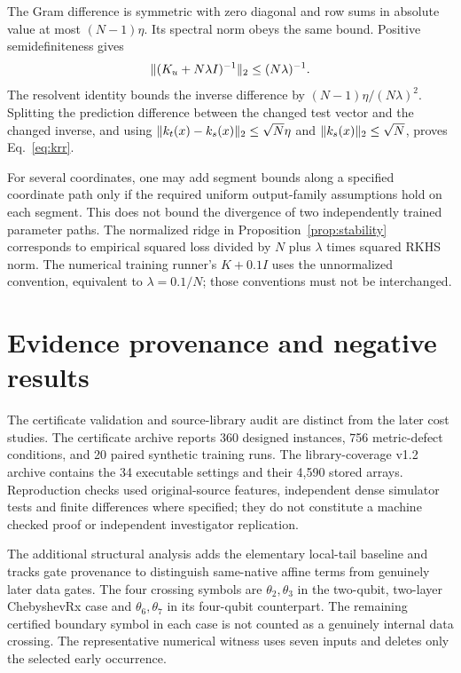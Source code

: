 The Gram difference is symmetric with zero diagonal and row sums in
absolute value at most $(N-1)\eta$. Its spectral norm obeys the
same bound. Positive semidefiniteness gives
\begin{equation}
 \lVert(K_u+N\lambda I)^{-1}\rVert_2\leq(N\lambda)^{-1}.
\end{equation}
The resolvent identity bounds the inverse difference by
$(N-1)\eta/(N\lambda)^2$. Splitting the prediction difference
between the changed test vector and the changed inverse, and using
$\lVert k_t(x)-k_s(x)\rVert_2\leq\sqrt N\eta$ and
$\lVert k_s(x)\rVert_2\leq\sqrt N$, proves Eq.~\eqref{eq:krr}.

For several coordinates, one may add segment bounds along a specified
coordinate path only if the required uniform output-family assumptions
hold on each segment. This does not bound the divergence of two
independently trained parameter paths. The normalized ridge in
Proposition~\ref{prop:stability} corresponds to empirical squared loss
divided by $N$ plus $\lambda$ times squared RKHS norm. The numerical
training runner's $K+0.1I$ uses the unnormalized convention, equivalent
to $\lambda=0.1/N$; those conventions must not be interchanged.

\section{Evidence provenance and negative results}
\label{app:evidence}
The certificate validation and source-library audit are distinct from
the later cost studies. The certificate archive reports 360 designed
instances, 756 metric-defect conditions, and 20 paired synthetic
training runs. The library-coverage v1.2 archive contains the 34
executable settings and their 4,590 stored arrays. Reproduction checks
used original-source features, independent dense simulator tests and
finite differences where specified; they do not constitute a machine
checked proof or independent investigator replication.

The additional structural analysis adds the elementary local-tail
baseline and tracks gate provenance to distinguish same-native affine
terms from genuinely later data gates. The four crossing symbols are
$\theta_2,\theta_3$ in the two-qubit, two-layer ChebyshevRx case and
$\theta_6,\theta_7$ in its four-qubit counterpart. The remaining
certified boundary symbol in each case is not counted as a genuinely
internal data crossing. The representative numerical witness uses
seven inputs and deletes only the selected early occurrence.

